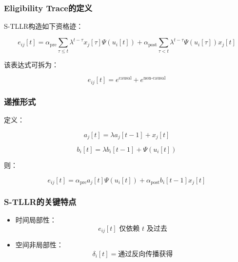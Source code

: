 \documentclass[journal,12pt,onecolumn]{IEEEtran}
\begin{document}
\subsubsection{Eligibility Trace的定义}

S-TLLR构造如下资格迹：

\begin{equation}
e_{ij}[t] =
\alpha_{\text{pre}} \sum_{\tau \le t} \lambda^{t-\tau} x_j[\tau] \Psi(u_i[t])
+
\alpha_{\text{post}} \sum_{\tau < t} \lambda^{t-\tau} \Psi(u_i[\tau]) x_j[t]
\end{equation}

该表达式可拆为：

\begin{equation}
e_{ij}[t] = e^{\text{causal}} + e^{\text{non-causal}}
\end{equation}



\subsubsection{递推形式}

定义：

\begin{equation}
a_j[t] = \lambda a_j[t-1] + x_j[t]
\end{equation}

\begin{equation}
b_i[t] = \lambda b_i[t-1] + \Psi(u_i[t])
\end{equation}

则：

\begin{equation}
e_{ij}[t] =
\alpha_{\text{pre}} a_j[t] \Psi(u_i[t])
+
\alpha_{\text{post}} b_i[t-1] x_j[t]
\end{equation}



\subsubsection{S-TLLR的关键特点}

\begin{itemize}
\item 时间局部性：
\begin{equation}
e_{ij}[t] \text{ 仅依赖 } t \text{ 及过去}
\end{equation}

\item 空间非局部性：
\begin{equation}
\delta_i[t] = \text{通过反向传播获得}
\end{equation}
\end{itemize}
\end{document}

